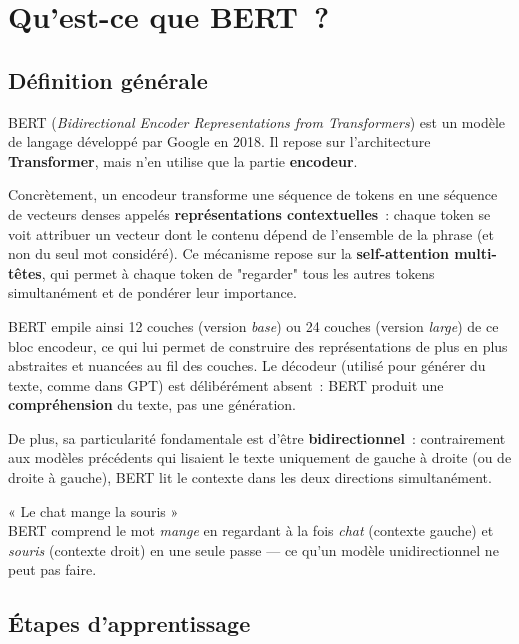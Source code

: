 \documentclass[12pt,a4paper]{report}
\begin{document}
\section{Qu'est-ce que BERT~?}

\subsection{Définition générale}

BERT (\textit{Bidirectional Encoder Representations from Transformers}) est un modèle
de langage développé par Google en 2018. Il repose sur
l'architecture \textbf{Transformer}, mais n'en utilise que la partie \textbf{encodeur}.

Concrètement, un encodeur transforme une séquence de tokens en une
séquence de vecteurs denses appelés \textbf{représentations contextuelles}~: chaque token
se voit attribuer un vecteur dont le contenu dépend de l'ensemble de la phrase (et non du
seul mot considéré). Ce mécanisme repose sur la \textbf{self-attention multi-têtes}, qui
permet à chaque token de "regarder" tous les autres tokens simultanément et de pondérer
leur importance. 

BERT empile ainsi 12 couches (version \textit{base}) ou 24 couches
(version \textit{large}) de ce bloc encodeur, ce qui lui permet de construire des
représentations de plus en plus abstraites et nuancées au fil des couches. Le décodeur
(utilisé pour générer du texte, comme dans GPT) est délibérément absent~: BERT produit
une \textbf{compréhension} du texte, pas une génération.

De plus, sa particularité fondamentale est d'être \textbf{bidirectionnel}~: contrairement aux
modèles précédents qui lisaient le texte uniquement de gauche à droite (ou de droite à
gauche), BERT lit le contexte dans les deux directions simultanément.

\vspace{10mm}

\begin{note}
« Le chat mange la souris »\\[4pt]
BERT comprend le mot \textit{mange} en regardant à la fois \textit{chat} (contexte gauche)
et \textit{souris} (contexte droit) en une seule passe — ce qu'un modèle unidirectionnel
ne peut pas faire.
\end{note}

\pagebreak

\subsection{Étapes d'apprentissage}
\end{document}
